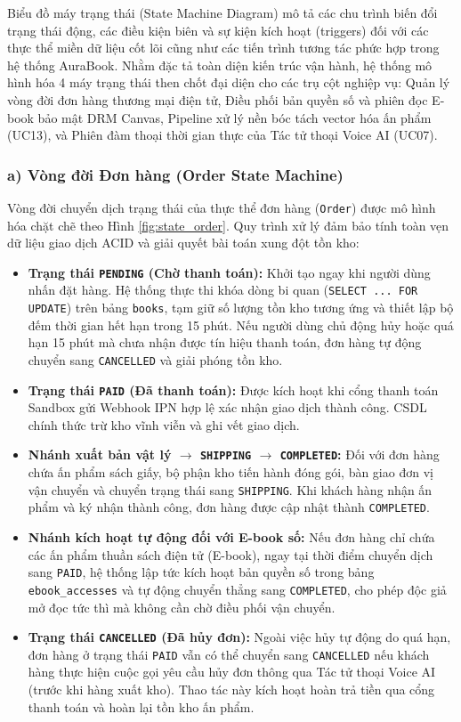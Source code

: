 \documentclass[11pt, a4paper]{report}
\begin{document}
Biểu đồ máy trạng thái (State Machine Diagram) mô tả các chu trình biến đổi trạng thái động, các điều kiện biên và sự kiện kích hoạt (triggers) đối với các thực thể miền dữ liệu cốt lõi cũng như các tiến trình tương tác phức hợp trong hệ thống AuraBook. Nhằm đặc tả toàn diện kiến trúc vận hành, hệ thống mô hình hóa 4 máy trạng thái then chốt đại diện cho các trụ cột nghiệp vụ: Quản lý vòng đời đơn hàng thương mại điện tử, Điều phối bản quyền số và phiên đọc E-book bảo mật DRM Canvas, Pipeline xử lý nền bóc tách vector hóa ấn phẩm (UC13), và Phiên đàm thoại thời gian thực của Tác tử thoại Voice AI (UC07).

\subsubsection{a) Vòng đời Đơn hàng (Order State Machine)}

Vòng đời chuyển dịch trạng thái của thực thể đơn hàng (\texttt{Order}) được mô hình hóa chặt chẽ theo Hình \ref{fig:state_order}. Quy trình xử lý đảm bảo tính toàn vẹn dữ liệu giao dịch ACID và giải quyết bài toán xung đột tồn kho:
\begin{itemize}
    \item \textbf{Trạng thái \texttt{PENDING} (Chờ thanh toán):} Khởi tạo ngay khi người dùng nhấn đặt hàng. Hệ thống thực thi khóa dòng bi quan (\texttt{SELECT ... FOR UPDATE}) trên bảng \texttt{books}, tạm giữ số lượng tồn kho tương ứng và thiết lập bộ đếm thời gian hết hạn trong 15 phút. Nếu người dùng chủ động hủy hoặc quá hạn 15 phút mà chưa nhận được tín hiệu thanh toán, đơn hàng tự động chuyển sang \texttt{CANCELLED} và giải phóng tồn kho.
    \item \textbf{Trạng thái \texttt{PAID} (Đã thanh toán):} Được kích hoạt khi cổng thanh toán Sandbox gửi Webhook IPN hợp lệ xác nhận giao dịch thành công. CSDL chính thức trừ kho vĩnh viễn và ghi vết giao dịch.
    \item \textbf{Nhánh xuất bản vật lý $\rightarrow$ \texttt{SHIPPING} $\rightarrow$ \texttt{COMPLETED}:} Đối với đơn hàng chứa ấn phẩm sách giấy, bộ phận kho tiến hành đóng gói, bàn giao đơn vị vận chuyển và chuyển trạng thái sang \texttt{SHIPPING}. Khi khách hàng nhận ấn phẩm và ký nhận thành công, đơn hàng được cập nhật thành \texttt{COMPLETED}.
    \item \textbf{Nhánh kích hoạt tự động đối với E-book số:} Nếu đơn hàng chỉ chứa các ấn phẩm thuần sách điện tử (E-book), ngay tại thời điểm chuyển dịch sang \texttt{PAID}, hệ thống lập tức kích hoạt bản quyền số trong bảng \texttt{ebook\_accesses} và tự động chuyển thẳng sang \texttt{COMPLETED}, cho phép độc giả mở đọc tức thì mà không cần chờ điều phối vận chuyển.
    \item \textbf{Trạng thái \texttt{CANCELLED} (Đã hủy đơn):} Ngoài việc hủy tự động do quá hạn, đơn hàng ở trạng thái \texttt{PAID} vẫn có thể chuyển sang \texttt{CANCELLED} nếu khách hàng thực hiện cuộc gọi yêu cầu hủy đơn thông qua Tác tử thoại Voice AI (trước khi hàng xuất kho). Thao tác này kích hoạt hoàn trả tiền qua cổng thanh toán và hoàn lại tồn kho ấn phẩm.
\end{itemize}
\end{document}
